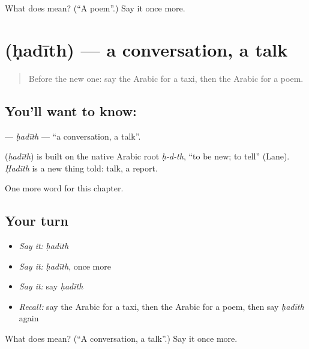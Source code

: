 \begin{tcolorbox}[breakable,colback=teal!4,colframe=teal!35!black,title={Before you move on}]
What does  mean? (\textquotedblleft{}A poem\textquotedblright{}.) Say it once more.
\end{tcolorbox}
\section[\texorpdfstring{\ar{حديث} (ḥadīth)}{حديث (ḥadīth)}]{ (ḥadīth) — a conversation, a talk}

\label{lesson:AR-C216-hadith}



\begin{quote}
Before the new one: say the Arabic for a taxi, then the Arabic for a poem.
\end{quote}

\subsection*{You'll want to know: }
\textbf{} — \emph{ḥadīth} — \textquotedblleft{}a conversation, a talk\textquotedblright{}.

\begin{cousinweb}
\textbf{} (\emph{ḥadīth}) is built on the native Arabic root \emph{ḥ-d-th}, \textquotedblleft{}to be new; to tell\textquotedblright{} (Lane). \emph{Ḥadīth} is a new thing told: talk, a report.
\end{cousinweb}

\begin{grammarlens}[title={What you've built}]
One more word for this chapter.
\end{grammarlens}

\subsection*{Your turn}
\begin{itemize}
\raggedright
  \item \emph{Say it:} \emph{ḥadīth}
  \item \emph{Say it:} \emph{ḥadīth}, once more
  \item \emph{Say it:} say \emph{ḥadīth}
  \item \emph{Recall:} say the Arabic for a taxi, then the Arabic for a poem, then say \emph{ḥadīth} again
\end{itemize}

\begin{tcolorbox}[breakable,colback=teal!4,colframe=teal!35!black,title={Before you move on}]
What does  mean? (\textquotedblleft{}A conversation, a talk\textquotedblright{}.) Say it once more.
\end{tcolorbox}
